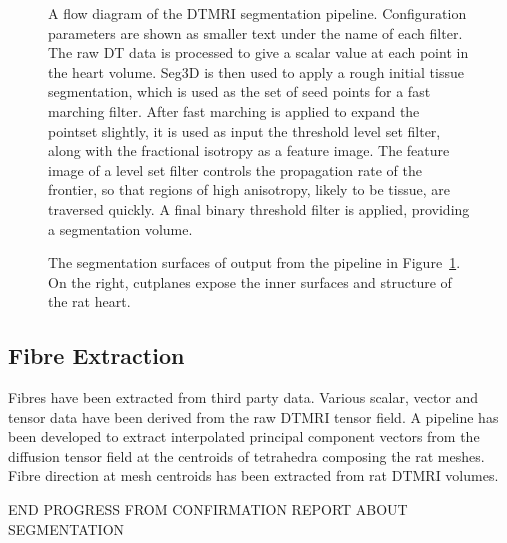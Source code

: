    
\begin{figure}[htbp]
  \centering
  \caption{A flow diagram of the DTMRI segmentation pipeline. Configuration parameters are shown as smaller text under the name of each filter. The raw DT data is processed to give a scalar value at each point in the heart volume. Seg3D is then used to apply a rough initial tissue segmentation, which is used as the set of seed points for a fast marching filter. After fast marching is applied to expand the pointset slightly, it is used as input the threshold level set filter, along with the fractional isotropy as a feature image. The feature image of a level set filter controls the propagation rate of the frontier, so that regions of high anisotropy, likely to be tissue, are traversed quickly. A final binary threshold filter is applied, providing a segmentation volume.}
  \label{fig:pipeline}
\end{figure}

\begin{figure}[htbp]
  \centering
  \caption{The segmentation surfaces of output from the pipeline in Figure~\ref{fig:pipeline}. On the right, cutplanes expose the inner surfaces and structure of the rat heart.}
  \label{fig:segmentation}
\end{figure}

\subsection{Fibre Extraction}
  Fibres have been extracted from third party data. Various scalar, vector and tensor data have been derived from the raw DTMRI tensor field. A pipeline has been developed to extract interpolated principal component vectors from the diffusion tensor field at the centroids of tetrahedra composing the rat meshes. Fibre direction at mesh centroids has been extracted from rat DTMRI volumes.


END PROGRESS FROM CONFIRMATION REPORT ABOUT SEGMENTATION

